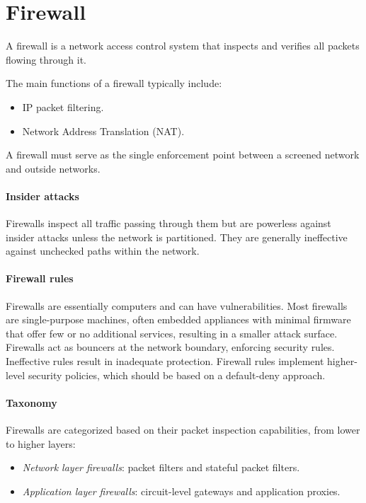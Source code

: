 \section{Firewall}

\begin{definition}
    A firewall is a network access control system that inspects and verifies all packets flowing through it.
\end{definition}
The main functions of a firewall typically include:
\begin{itemize}
    \item IP packet filtering.
    \item Network Address Translation (NAT).
\end{itemize}
A firewall must serve as the single enforcement point between a screened network and outside networks.

\paragraph*{Insider attacks}
Firewalls inspect all traffic passing through them but are powerless against insider attacks unless the network is partitioned.
They are generally ineffective against unchecked paths within the network.

\paragraph*{Firewall rules}
Firewalls are essentially computers and can have vulnerabilities. 
Most firewalls are single-purpose machines, often embedded appliances with minimal firmware that offer few or no additional services, resulting in a smaller attack surface. 
Firewalls act as bouncers at the network boundary, enforcing security rules. 
Ineffective rules result in inadequate protection. 
Firewall rules implement higher-level security policies, which should be based on a default-deny approach.

\paragraph*{Taxonomy}
Firewalls are categorized based on their packet inspection capabilities, from lower to higher layers:
\begin{itemize}
    \item \textit{Network layer firewalls}: packet filters and stateful packet filters. 
    \item \textit{Application layer firewalls}: circuit-level gateways and application proxies. 
\end{itemize}

